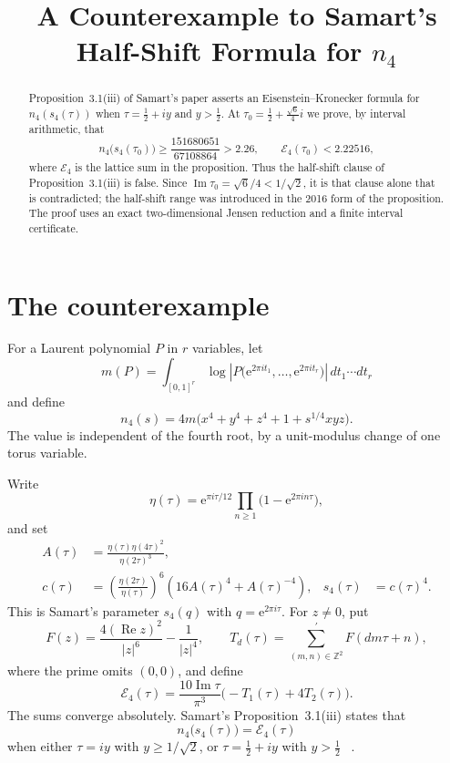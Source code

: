 \documentclass[11pt]{amsart}
\title[A counterexample to Samart's half-shift formula]
      {A Counterexample to Samart's Half-Shift Formula for $n_4$}
\date{}
\newcommand{\Z}{\mathbb Z}
\newcommand{\e}{\mathrm e}
\newcommand{\EK}{\mathcal E_4}
\renewcommand{\Re}{\operatorname{Re}}
\renewcommand{\Im}{\operatorname{Im}}
\begin{document}
\begin{abstract}
Proposition~3.1(iii) of Samart's paper asserts an Eisenstein--Kronecker
formula for $n_4(s_4(\tau))$ when
$\tau=\frac12+iy$ and $y>\frac12$. At
$\tau_0=\frac12+\frac{\sqrt6}{4}i$ we prove, by interval arithmetic,
that
\[
 n_4\bigl(s_4(\tau_0)\bigr)
 \ge \frac{151680651}{67108864}>2.26,
 \qquad
 \mathcal E_4(\tau_0)<2.22516,
\]
where $\mathcal E_4$ is the lattice sum in the proposition. Thus the
half-shift clause of Proposition~3.1(iii) is false. Since
$\Im\tau_0=\sqrt6/4<1/\sqrt2$, it is that clause alone that is
contradicted; the half-shift range was introduced in the 2016 form of
the proposition. The proof uses an
exact two-dimensional Jensen reduction and a finite interval
certificate.
\end{abstract}

\maketitle

\section{The counterexample}

For a Laurent polynomial $P$ in $r$ variables, let
\[
 m(P)=\int_{[0,1]^r}
 \log\left|P\bigl(\e^{2\pi i t_1},\ldots,\e^{2\pi i t_r}\bigr)\right|
 \,dt_1\cdots dt_r
\]
and define
\[
 n_4(s)=4m\bigl(x^4+y^4+z^4+1+s^{1/4}xyz\bigr).
\]
The value is independent of the fourth root, by a unit-modulus change
of one torus variable.

Write
\[
 \eta(\tau)=\e^{\pi i\tau/12}
 \prod_{n\ge1}\bigl(1-\e^{2\pi i n\tau}\bigr),
\]
and set
\begin{align*}
 A(\tau)&=\frac{\eta(\tau)\eta(4\tau)^2}{\eta(2\tau)^3},\\
 c(\tau)&=\left(\frac{\eta(2\tau)}{\eta(\tau)}\right)^6
 \left(16A(\tau)^4+A(\tau)^{-4}\right),
 &s_4(\tau)&=c(\tau)^4.
\end{align*}
This is Samart's parameter $s_4(q)$ with $q=\e^{2\pi i\tau}$.
For $z\ne0$, put
\[
 F(z)=\frac{4(\Re z)^2}{|z|^6}-\frac1{|z|^4},
 \qquad
 T_d(\tau)=\sum_{(m,n)\in\Z^2}^{\prime}F(dm\tau+n),
\]
where the prime omits $(0,0)$, and define
\[
 \EK(\tau)=\frac{10\Im\tau}{\pi^3}
 \bigl(-T_1(\tau)+4T_2(\tau)\bigr).
\]
The sums converge absolutely. Samart's Proposition~3.1(iii) states
that
\begin{equation}\label{eq:samart}
 n_4\bigl(s_4(\tau)\bigr)=\EK(\tau)
\end{equation}
when either $\tau=iy$ with $y\ge1/\sqrt2$, or
$\tau=\frac12+iy$ with $y>\frac12$%
~\cite[Proposition~3.1(iii)]{Samart2016}.
\end{document}
